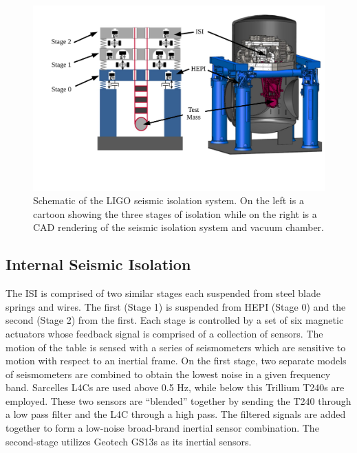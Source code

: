 \documentclass [12pt, proquest]{uwthesis}[2019]
\begin{document}
\begin{figure}[!h]
\begin{center}
\includegraphics[width=\textwidth]{seismicIso.pdf}
\caption[Schematic of the LIGO seismic isolation system]{Schematic of the LIGO seismic isolation system. \cite{ligoSeis} On the left is a cartoon showing the three stages of isolation while on the right is a CAD rendering of the seismic isolation system and vacuum chamber.}
\label{wind}
\end{center}
\end{figure}

\subsection{Internal Seismic Isolation}\label{ISI}

The ISI is comprised of two similar stages each suspended from steel blade springs and wires. The first (Stage 1) is suspended from HEPI (Stage 0) and the second (Stage 2) from the first. Each stage is controlled by a set of six magnetic actuators whose feedback signal is comprised of a collection of sensors. The motion of the table is sensed with a series of seismometers which are sensitive to motion with respect to an inertial frame. On the first stage, two separate models of seismometers are combined to obtain the lowest noise in a given frequency band. Sarcelles L4Cs are used above 0.5 Hz, while below this Trillium T240s are employed. These two sensors are ``blended'' together by sending the T240 through a low pass filter and the L4C through a high pass. The filtered signals are added together to form a low-noise broad-brand inertial sensor combination. The second-stage utilizes Geotech GS13s as its inertial sensors.
\end{document}
